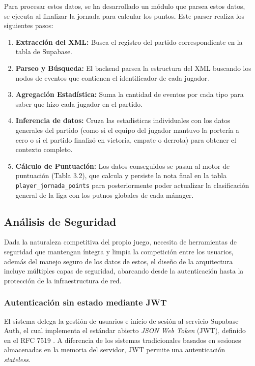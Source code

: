 Para procesar estos datos, se ha desarrollado un módulo que parsea estos datos, se ejecuta al finalizar la jornada para calcular los puntos. Este parser realiza los siguientes pasos:
\begin{enumerate}
    \item \textbf{Extracción del XML:} Busca el registro del partido correspondiente en la tabla de Supabase.
    \item \textbf{Parseo y Búsqueda:} El backend parsea la estructura del XML buscando los nodos de eventos que contienen el identificador de cada jugador.
    \item \textbf{Agregación Estadística:} Suma la cantidad de eventos por cada tipo para saber que hizo cada jugador en el partido.
    \item \textbf{Inferencia de datos:} Cruza las estadísticas individuales con los datos generales del partido (como si el equipo del jugador mantuvo la portería a cero o si el partido finalizó en victoria, empate o derrota) para obtener el contexto completo.
    \item \textbf{Cálculo de Puntuación:} Los datos conseguidos se pasan al motor de puntuación (Tabla 3.2), que calcula y persiste la nota final en la tabla \texttt{player\_jornada\_points} para posteriormente poder actualizar la clasificación general de la liga con los putnos globales de cada mánager.
\end{enumerate}

\subsection{Análisis de Seguridad}
Dada la naturaleza competitiva del propio juego, necesita de herramientas de seguridad que mantengan íntegra y limpia la competición entre los usuarios, además del manejo seguro de los datos de estos, el diseño de la arquitectura incluye múltiples capas de seguridad, abarcando desde la autenticación hasta la protección de la infraestructura de red.

\subsubsection{Autenticación sin estado mediante JWT}
El sistema delega la gestión de usuarios e inicio de sesión al servicio Supabase Auth, el cual implementa el estándar abierto \textit{JSON Web Token} (JWT), definido en el RFC 7519 \cite{rfc7519_jwt}. A diferencia de los sistemas tradicionales basados en sesiones almacenadas en la memoria del servidor, JWT permite una autenticación \textit{stateless}.

